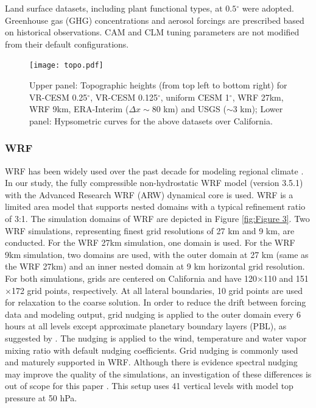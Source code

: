 Land surface datasets, including plant functional types, at $0.5$$^\circ$ were adopted. Greenhouse gas (GHG) concentrations and aerosol forcings are prescribed based on historical observations. CAM and CLM tuning parameters are not modified from their default configurations.

\begin{figure}
\begin{center}
\texttt{[image: topo.pdf]}
\end{center}
\caption{Upper panel: Topographic heights (from top left to bottom right) for VR-CESM 0.25$^\circ$, VR-CESM 0.125$^\circ$, uniform CESM 1$^\circ$, WRF 27km, WRF 9km, ERA-Interim ($\Delta x \sim$80 km) and USGS ($\sim$3 km); Lower panel: Hypsometric curves for the above datasets over California.} \label{fig:Figure 2} 
\end{figure}

\subsubsection{WRF} 

WRF has been widely used over the past decade for modeling regional climate \cite{lo2008assessment, leung2009atmospheric, soares2012wrf, sun2015hybrid}. In our study, the fully compressible non-hydrostatic WRF model (version 3.5.1) with the Advanced Research WRF (ARW) dynamical core is used.  WRF is a limited area model that supports nested domains with a typical refinement ratio of 3:1.  The simulation domains of WRF are depicted in Figure \ref{fig:Figure 3}. Two WRF simulations, representing finest grid resolutions of 27 km and 9 km, are conducted.  For the WRF 27km simulation, one domain is used. For the WRF 9km simulation, two domains are used, with the outer domain at 27 km (same as the WRF 27km) and an inner nested domain at 9 km horizontal grid resolution. For both simulations,  grids are centered on California and have 120$\times$110 and 151$\times$172 grid points, respectively. At all lateral boundaries, 10 grid points are used for relaxation to the coarse solution. In order to reduce the drift between forcing data and modeling output, grid nudging \cite{stauffer1990use} is applied to the outer domain every 6 hours at all levels except approximate planetary boundary layers (PBL), as suggested by \cite{lo2008assessment}. The nudging is applied to the wind, temperature and water vapor mixing ratio with default nudging coefficients. Grid nudging is commonly used and maturely supported in WRF. Although there is evidence spectral nudging may improve the quality of the simulations, an investigation of these differences is out of scope for this paper \cite{liu2012differences}. This setup uses 41 vertical levels with model top pressure at 50 hPa.

